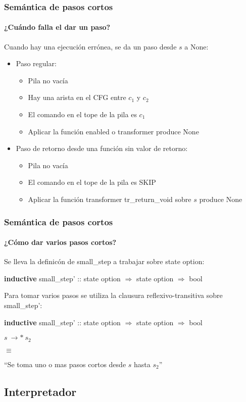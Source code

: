 \begin{frame}
\frametitle{Semántica de pasos cortos}
\framesubtitle{¿Cuándo falla el dar un paso?}

Cuando hay una ejecución errónea, se da un paso desde $s$ a None:
\begin{itemize}
\item{Paso regular:}
\begin{itemize}
\item{Pila no vacía}
\item{Hay una arista en el CFG entre $c_1$ y $c_2$}
\item{El comando en el tope de la pila es $c_1$}
\item{Aplicar la función enabled o transformer produce None}
\end{itemize}
\item{Paso de retorno desde una función sin valor de retorno:}
\begin{itemize}
\item{Pila no vacía}
\item{El comando en el tope de la pila es SKIP}
\item{Aplicar la función transformer tr\_return\_void sobre $s$ produce None}
\end{itemize}
\end{itemize}


\end{frame}


\begin{frame}
\frametitle{Semántica de pasos cortos}
\framesubtitle{¿Cómo dar varios pasos cortos?}

Se lleva la definicón de small\_step a trabajar sobre state option:

\bigskip
\textbf{inductive} small\_step' :: state option $\Rightarrow$ state option $\Rightarrow$ bool
\bigskip
\pause

Para tomar varios pasos se utiliza la clausura reflexivo-transitiva sobre small\_step':

\bigskip
\textbf{inductive} small\_step' :: state option $\Rightarrow$ state option $\Rightarrow$ bool
\bigskip

$s\ \rightarrow*\ s_2$

$\equiv$

``Se toma uno o mas pasos cortos desde $s$ hasta $s_2$''



\end{frame}


\subsection{Interpretador}


